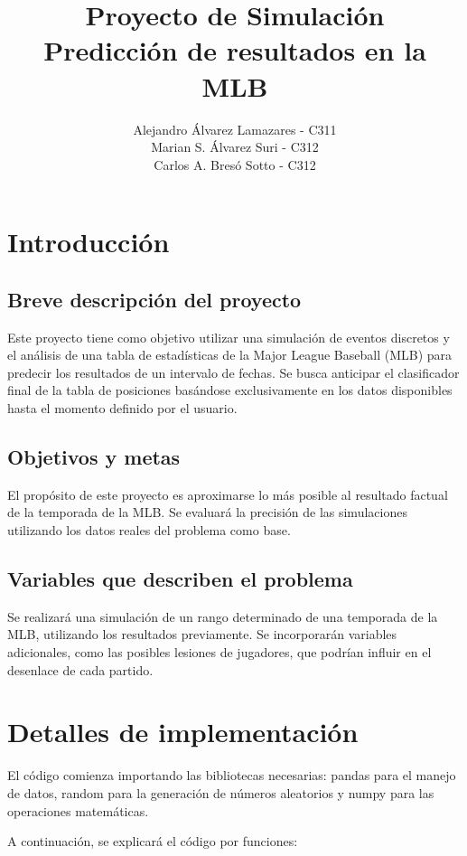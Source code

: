 \documentclass{article}
\title{Proyecto de Simulación	
    \\
    \large Predicción de resultados en la MLB}
\author{Alejandro Álvarez Lamazares - C311
\\
        Marian S. Álvarez Suri - C312
        \\
        Carlos A. Bresó Sotto - C312}
\date{}
\begin{document}
    \maketitle
    \large

    \section{Introducción}

        \subsection{Breve descripción del proyecto}
            Este proyecto tiene como objetivo utilizar una simulación de eventos discretos y el análisis de una tabla de estadísticas de la Major League Baseball (MLB) para predecir los resultados de un intervalo de fechas. Se busca anticipar el clasificador final de la tabla de posiciones basándose exclusivamente en los datos disponibles hasta el momento definido por el usuario.

        \subsection{Objetivos y metas}
            El propósito de este proyecto es aproximarse lo más posible al resultado factual de la temporada de la MLB. Se evaluará la precisión de las simulaciones utilizando los datos reales del problema como base.

        \subsection{Variables que describen el problema}
            Se realizará una simulación de un rango determinado de una temporada de la MLB, utilizando los resultados previamente. Se incorporarán variables adicionales, como las posibles lesiones de jugadores, que podrían influir en el desenlace de cada partido.

    \section{Detalles de implementación}

        El código comienza importando las bibliotecas necesarias: pandas para el manejo de datos, random para la generación de números aleatorios y numpy para las operaciones matemáticas.

        A continuación, se explicará el código por funciones:
\end{document}
